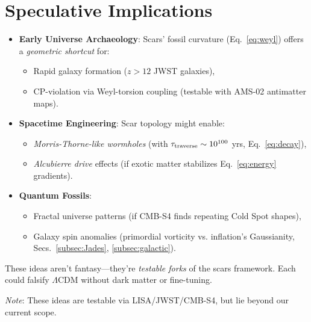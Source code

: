 \documentclass{article}
\begin{document}
\section{Speculative Implications}  
\label{sec:speculations}  
\FloatBarrier
\begin{itemize}  

  \item \textbf{Early Universe Archaeology}:  
  Scars' fossil curvature (Eq.~\ref{eq:weyl}) offers a \textit{geometric shortcut} for:  
  \begin{itemize}  
    \item Rapid galaxy formation ($z>12$ JWST galaxies),  
    \item CP-violation via Weyl-torsion coupling (testable with AMS-02 antimatter maps).  
  \end{itemize}  

  \item \textbf{Spacetime Engineering}:  
  Scar topology might enable:  
  \begin{itemize}  
    \item \textit{Morris-Thorne-like wormholes} (with $\tau_{\rm traverse} \sim 10^{100}$ yrs, Eq.~\ref{eq:decay}),  
    \item \textit{Alcubierre drive} effects (if exotic matter stabilizes Eq.~\ref{eq:energy} gradients).  
  \end{itemize}  

  \item \textbf{Quantum Fossils}:  
  \begin{itemize}  
    \item Fractal universe patterns (if CMB-S4 finds repeating Cold Spot shapes),  
    \item Galaxy spin anomalies (primordial vorticity vs. inflation’s Gaussianity, Secs.~\ref{subsec:Jades}, \ref{subsec:galactic}).  
  \end{itemize}  

\end{itemize}  
\begin{tcolorbox}[colback=boxnormal,colframe=blue!50!black,title=\textbf{Why Speculate?}]  
These ideas aren’t fantasy—they’re \textit{testable forks} of the scars framework. Each could falsify $\Lambda$CDM without dark matter or fine-tuning.  
\end{tcolorbox}

\textit{Note}: These ideas are testable via LISA/JWST/CMB-S4, but lie beyond our current scope. 
\end{document}
